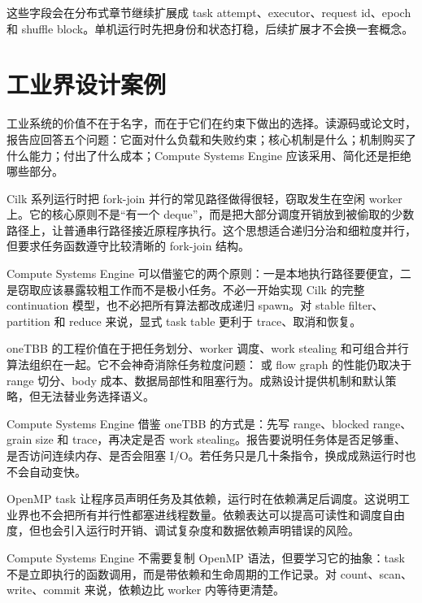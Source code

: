 这些字段会在分布式章节继续扩展成 task attempt、executor、request id、epoch 和 shuffle block。单机运行时先把身份和状态打稳，后续扩展才不会换一套概念。

\section{工业界设计案例}

工业系统的价值不在于名字，而在于它们在约束下做出的选择。读源码或论文时，报告应回答五个问题：它面对什么负载和失败约束；核心机制是什么；机制购买了什么能力；付出了什么成本；Compute Systems Engine 应该采用、简化还是拒绝哪些部分。

\begin{casebox}
Cilk 系列运行时把 fork-join 并行的常见路径做得很轻，窃取发生在空闲 worker 上。它的核心原则不是“有一个 deque”，而是把大部分调度开销放到被偷取的少数路径上，让普通串行路径接近原程序执行。这个思想适合递归分治和细粒度并行，但要求任务函数遵守比较清晰的 fork-join 结构。

Compute Systems Engine 可以借鉴它的两个原则：一是本地执行路径要便宜，二是窃取应该暴露较粗工作而不是极小任务。不必一开始实现 Cilk 的完整 continuation 模型，也不必把所有算法都改成递归 spawn。对 stable filter、partition 和 reduce 来说，显式 task table 更利于 trace、取消和恢复。
\end{casebox}

\begin{casebox}
oneTBB 的工程价值在于把任务划分、worker 调度、work stealing 和可组合并行算法组织在一起。它不会神奇消除任务粒度问题： 或 flow graph 的性能仍取决于 range 切分、body 成本、数据局部性和阻塞行为。成熟设计提供机制和默认策略，但无法替业务选择语义。

Compute Systems Engine 借鉴 oneTBB 的方式是：先写 range、blocked range、grain size 和 trace，再决定是否 work stealing。报告要说明任务体是否足够重、是否访问连续内存、是否会阻塞 I/O。若任务只是几十条指令，换成成熟运行时也不会自动变快。
\end{casebox}

\begin{casebox}
OpenMP task 让程序员声明任务及其依赖，运行时在依赖满足后调度。这说明工业界也不会把所有并行性都塞进线程数量。依赖表达可以提高可读性和调度自由度，但也会引入运行时开销、调试复杂度和数据依赖声明错误的风险。

Compute Systems Engine 不需要复制 OpenMP 语法，但要学习它的抽象：task 不是立即执行的函数调用，而是带依赖和生命周期的工作记录。对 count、scan、write、commit 来说，依赖边比 worker 内等待更清楚。
\end{casebox}

